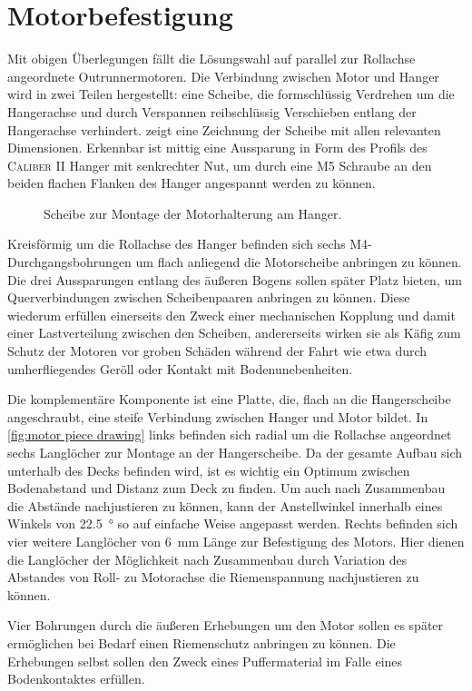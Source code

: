 	\section{Motorbefestigung}\label{sec:motorbefestigung}
		Mit obigen Überlegungen fällt die Lösungswahl auf parallel zur Rollachse angeordnete Outrunnermotoren.
		Die Verbindung zwischen Motor und Hanger wird in zwei Teilen hergestellt: eine Scheibe, die formschlüssig Verdrehen um die Hangerachse und durch Verspannen reibschlüssig Verschieben entlang der Hangerachse verhindert.
		 zeigt eine Zeichnung der Scheibe mit allen relevanten Dimensionen.
		Erkennbar ist mittig eine Aussparung in Form des Profils des \textsc{Caliber II} Hanger mit senkrechter Nut, um durch eine M5 Schraube an den beiden flachen Flanken des Hanger angespannt werden zu können.
		\begin{figure}[h]
			\centering
			
			\caption[Scheibe zur Montage der Motorhalterung am Hanger]{Scheibe zur Montage der Motorhalterung am Hanger.}
			\label{fig:hanger clamp drawing}
		\end{figure}
		Kreisförmig um die Rollachse des Hanger befinden sich sechs M4-Durchgangsbohrungen um flach anliegend die Motorscheibe anbringen zu können.
		Die drei Aussparungen entlang des äußeren Bogens sollen später Platz bieten, um Querverbindungen zwischen Scheibenpaaren anbringen zu können.
		Diese wiederum erfüllen einerseits den Zweck einer mechanischen Kopplung und damit einer Lastverteilung zwischen den Scheiben, andererseits wirken sie als Käfig zum Schutz der Motoren vor groben Schäden während der Fahrt wie etwa durch umherfliegendes Geröll oder Kontakt mit Bodenunebenheiten.\par\medskip
		Die komplementäre Komponente ist eine Platte, die, flach an die Hangerscheibe angeschraubt, eine steife Verbindung zwischen Hanger und Motor bildet.
		In \cref{fig:motor piece drawing} links befinden sich radial um die Rollachse angeordnet sechs Langlöcher zur Montage an der Hangerscheibe.
		Da der gesamte Aufbau sich unterhalb des Decks befinden wird, ist es wichtig ein Optimum zwischen Bodenabstand und Distanz zum Deck zu finden.
		Um auch nach Zusammenbau die Abstände nachjustieren zu können, kann der Anstellwinkel innerhalb eines Winkels von \qty{22,5}{\degree} so auf einfache Weise angepasst werden.
		Rechts befinden sich vier weitere Langlöcher von \qty{6}{\milli\metre} Länge zur Befestigung des Motors.
		Hier dienen die Langlöcher der Möglichkeit nach Zusammenbau durch Variation des Abstandes von Roll- zu Motorachse die Riemenspannung nachjustieren zu können.\par
		Vier Bohrungen durch die äußeren Erhebungen um den Motor sollen es später ermöglichen bei Bedarf einen Riemenschutz anbringen zu können.
		Die Erhebungen selbst sollen den Zweck eines Puffermaterial im Falle eines Bodenkontaktes erfüllen.


